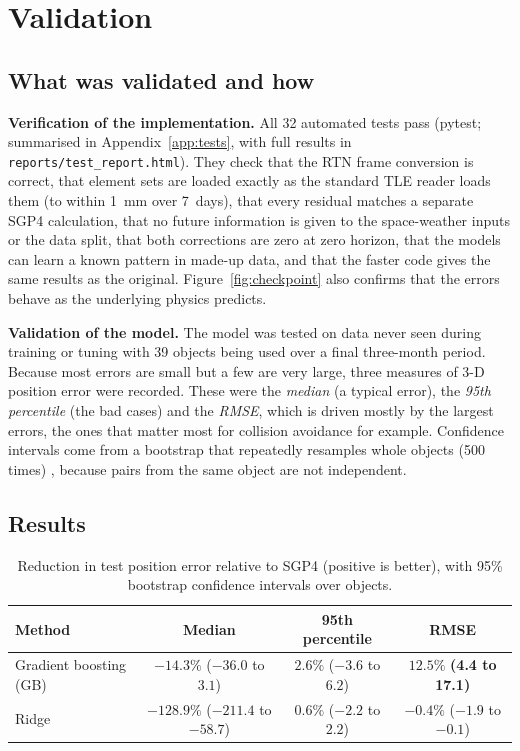 \documentclass[11pt, a4paper]{article}
\begin{document}
\section{Validation}\label{sec:5}

\subsection{What was validated and how}

\textbf{Verification of the implementation.} All 32 automated tests pass (pytest; summarised in Appendix~\ref{app:tests}, with full results in \texttt{reports/test\_report.html}). They check that the RTN frame conversion is correct, that element sets are loaded exactly as the standard TLE reader loads them (to within 1~mm over 7~days), that every residual matches a separate SGP4 calculation, that no future information is given to the space-weather inputs or the data split, that both corrections are zero at zero horizon, that the models can learn a known pattern in made-up data, and that the faster code gives the same results as the original. Figure~\ref{fig:checkpoint} also confirms that the errors behave as the underlying physics predicts.

\textbf{Validation of the model.} The model was tested on data never seen during training or tuning with 39 objects being used over a final three-month period. Because most errors are small but a few are very large, three measures of 3-D position error were recorded. These were the \emph{median} (a typical error), the \emph{95th percentile} (the bad cases) and the \emph{RMSE}, which is driven mostly by the largest errors, the ones that matter most for collision avoidance for example. Confidence intervals come from a bootstrap that repeatedly resamples whole objects (500 times) \cite{efron1993}, because pairs from the same object are not independent.

\subsection{Results}

\begin{table}[htbp]
\centering
\small
\caption{Reduction in test position error relative to SGP4 (positive is better), with 95\% bootstrap confidence intervals over objects.}
\label{tab:bootstrap}
\begin{tabular}{lccc}
\toprule
Method & Median & 95th percentile & RMSE \\
\midrule
Gradient boosting (GB) & $-14.3\%$ ($-36.0$ to $3.1$) & $2.6\%$ ($-3.6$ to $6.2$) & $\mathbf{12.5\%}$ \textbf{(4.4 to 17.1)} \\
Ridge & $-128.9\%$ ($-211.4$ to $-58.7$) & $0.6\%$ ($-2.2$ to $2.2$) & $-0.4\%$ ($-1.9$ to $-0.1$) \\
\bottomrule
\end{tabular}
\end{table}
\end{document}

